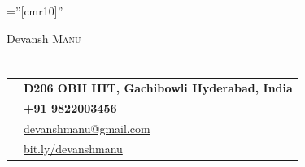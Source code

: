 \documentclass[a4paper,10pt]{article}
\begin{document}

\pagestyle{empty} %

\font\fb=''[cmr10]'' %

\par{\centering
		{\Huge Devansh \textsc{Manu}
	}\par}

\section{}

\begin{tabular}{rl}
    \textsc   &\textbf{ D206 OBH IIIT, Gachibowli Hyderabad, India} \\
    \textsc     & \textbf{+91 9822003456}\\
    \textsc    & \href{mailto:devanshmanu@gmail.com}{devanshmanu@gmail.com}\\
    \textsc     &\href{https://devanshmanu.github.io}{bit.ly/devanshmanu}
    
\end{tabular}

\end{document}

